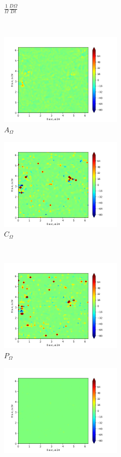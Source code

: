 \begin{figure}[H]
\begin{subfigure}[H]{0.45\textwidth}
        \caption{$\frac{1}{\Omega} \frac{D \Omega}{Dt}$}
    \end{subfigure}
    ~
    \begin{subfigure}{0.45\textwidth}
        \includegraphics[height=1.75in]{media/run-cds-65/A-enst-1460.png}
        \caption{$A_{\Omega}$}
    \end{subfigure}
    \newline
    \begin{subfigure}{0.45\textwidth}
        \includegraphics[height=1.75in]{media/run-cds-65/Pi-enst-1460.png}
        \caption{$C_{\Omega}$}
    \end{subfigure}
    ~
    \begin{subfigure}{0.45\textwidth}
        \includegraphics[height=1.75in]{media/run-cds-65/P-enst-1460.png}
        \caption{$P_{\Omega}$}
    \end{subfigure}
    \newline
    \begin{subfigure}{0.45\textwidth}
        \includegraphics[height=1.75in]{media/run-cds-65/B-enst-1460.png}

\end{subfigure}
\end{figure}
